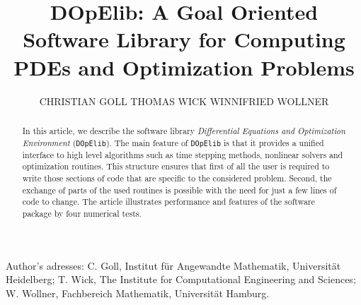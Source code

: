 \documentclass[prodmode,acmtoms]{acmsmall}
\numberwithin{equation}{section}
\newcommand{\dope}{\texttt{DOpElib}}
\begin{document}

\title{DOpElib: A Goal Oriented Software Library for Computing PDEs and Optimization Problems}

\author{CHRISTIAN GOLL
THOMAS WICK
WINNIFRIED WOLLNER
}


\begin{abstract}
In this article, we describe the software library 
\textit{Differential Equations and Optimization Environment} (\dope{}).
The main feature of \dope{} is that it provides a unified interface to high level algorithms 
such as time stepping methods, nonlinear solvers and optimization routines. This structure ensures 
that first of all the user is required to write those sections of code that are specific to 
the considered problem. Second, the exchange of parts of the used routines is possible 
with the need for just a few lines of code to change.
The article illustrates performance and features 
of the software package by four numerical tests. 
\end{abstract}





\begin{bottomstuff}
Author's adresses: C. Goll, Institut f\"ur Angewandte Mathematik,
Universit\"at Heidelberg;
T. Wick, The Institute for Computational Engineering and Sciences;
W. Wollner, Fachbereich Mathematik, Universit\"at Hamburg.
\end{bottomstuff}
                      

\maketitle


\end{document}
